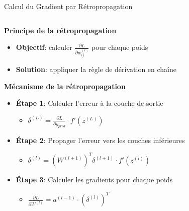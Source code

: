 \documentclass[aspectratio=169,11pt]{beamer}
\begin{document}
\begin{frame}{Calcul du Gradient par Rétropropagation}
    \begin{columns}
        \begin{column}{0.5\textwidth}
            \textbf{Principe de la rétropropagation}
            \begin{itemize}
                \item \textbf{Objectif}: calculer $\frac{\partial L}{\partial w_{ij}^{(l)}}$ pour chaque poids
                \item \textbf{Solution}: appliquer la règle de dérivation en chaîne
            \end{itemize}
            
            \vspace{0.3cm}
            \textbf{Mécanisme de la rétropropagation}
            \begin{itemize}
                \item \textbf{Étape 1}: Calculer l'erreur à la couche de sortie
                \begin{itemize}
                    \item $\delta^{(L)} = \frac{\partial L}{\partial y_{pred}} \cdot f'(z^{(L)})$
                \end{itemize}
                \item \textbf{Étape 2}: Propager l'erreur vers les couches inférieures
                \begin{itemize}
                    \item $\delta^{(l)} = (W^{(l+1)})^T \delta^{(l+1)} \cdot f'(z^{(l)})$
                \end{itemize}
                \item \textbf{Étape 3}: Calculer les gradients pour chaque poids
                \begin{itemize}
                    \item $\frac{\partial L}{\partial W^{(l)}} = a^{(l-1)} \cdot (\delta^{(l)})^T$
                \end{itemize}
            \end{itemize}
        \end{column}
        \begin{column}{0.5\textwidth}
            \begin{center}
\end{center}
\end{column}
\end{columns}
\end{frame}
\end{document}
